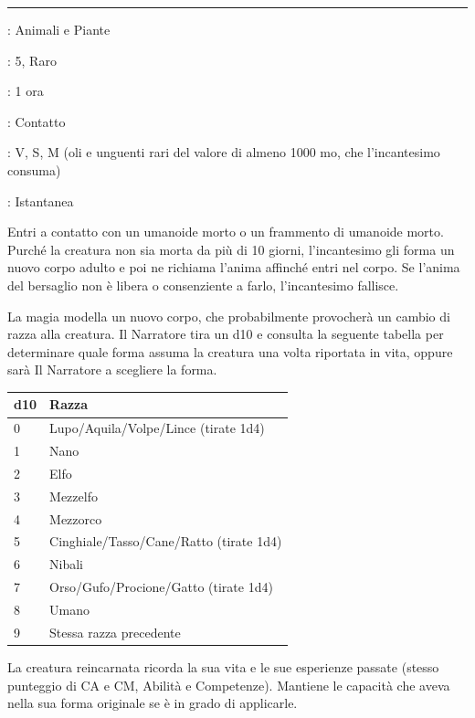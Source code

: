 \begin{multicols}{2}
\smallskip\noindent\rule{\linewidth}{2pt} \hypertarget{Reincarnazione}{}\smallskip{}
\noindent
\begin{description}[noitemsep, topsep=0pt, parsep=0pt, partopsep=0pt, leftmargin=0cm, labelwidth=2.8cm]
	\item[\textbf{Lista di Magia}]: Animali e Piante
	\item[\textbf{Livello}]: 5, Raro
	\item[\textbf{T. di Lancio}]: 1 ora
	\item[\textbf{Gittata}]: Contatto
	\item[\textbf{Componenti}]: V, S, M (oli e unguenti rari del valore di almeno 1000 mo, che l'incantesimo consuma)
	\item[\textbf{Durata}]: Istantanea
\end{description}

Entri a contatto con un umanoide morto o un frammento di umanoide morto. Purché la creatura non sia morta da più di 10 giorni, l'incantesimo gli forma un nuovo corpo adulto e poi ne richiama l'anima affinché entri nel corpo. Se l'anima del bersaglio non è libera o consenziente a farlo, l'incantesimo fallisce.

La magia modella un nuovo corpo, che probabilmente provocherà un cambio di razza alla creatura. Il Narratore tira un d10 e consulta la seguente tabella per determinare quale forma assuma la creatura una volta riportata in vita, oppure sarà Il Narratore a scegliere la forma.

\medskip

\begin{tabular}{ll}
	\textbf{d10} &\textbf{Razza}\\
	\toprule
	0 & Lupo/Aquila/Volpe/Lince (tirate 1d4)\\
	1&Nano\\
	2&Elfo\\
	3&Mezzelfo\\
	4&Mezzorco\\
	5&Cinghiale/Tasso/Cane/Ratto (tirate 1d4)\\
	6&Nibali\\
	7&Orso/Gufo/Procione/Gatto (tirate 1d4)\\
	8&Umano\\
	9&Stessa razza precedente
\end{tabular}

\medskip

La creatura reincarnata ricorda la sua vita e le sue esperienze passate (stesso punteggio di CA e CM, Abilità e Competenze). Mantiene le capacità che aveva nella sua forma originale se è in grado di applicarle.


\end{multicols}
